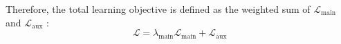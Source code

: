 \documentclass[letterpaper]{article} %
\begin{document}
Therefore, the total learning objective is defined as the weighted sum of $\mathcal{L}_{\mathrm{main}}$
 and $\mathcal{L}_{\mathrm{aux}}$
:
\begin{equation}
\mathcal{L}
=\lambda_{\mathrm{main}}\mathcal{L}_{\mathrm{main}} + \mathcal{L}_{\mathrm{aux}}
\label{eq:training_objective}
\end{equation}









\end{document}
